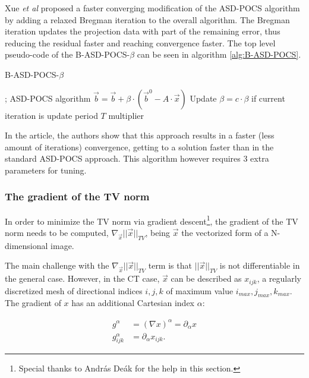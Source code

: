 Xue \textit{et al}\cite{B_ASD_POCS_beta} proposed a faster converging modification of the ASD-POCS algorithm by adding a relaxed Bregman iteration to the overall algorithm. The Bregman iteration updates the projection data with part of the remaining error, thus reducing the residual faster and reaching convergence faster. The top level pseudo-code of the B-ASD-POCS-$\beta$  can be seen in algorithm \ref{alg:B-ASD-POCS}.
%

\begin{algorithm}

\caption{B-ASD-POCS-$\beta$
\label{alg:B-ASD-POCS}}
\begin{algorithmic}[1]
;
\State ASD-POCS algorithm
\EndFor
\State $\vec{b}=\vec{b}+\beta\cdot(\vec{b}^0-A\cdot\vec{x})$
\State Update $\beta=c\cdot\beta$ if current iteration is update period $T$ multiplier 
\EndWhile

\end{algorithmic}
\end{algorithm}

In the article, the authors show that this approach results in a faster (less amount of iterations) convergence,  getting to a solution faster than in the standard ASD-POCS approach. This algorithm however requires 3 extra parameters for tuning. 


\FloatBarrier
\subsubsection{The gradient of the TV norm}

In order to minimize the TV norm via gradient descent\footnote{Special thanks to Andr\'as De\'ak for the help\cite{Andras} in this section.}, the gradient of the TV norm needs to be computed, $ \nabla_{\vec{x}} ||\vec x ||_{TV}$, being $\vec x$ the vectorized form of a N-dimensional image.

The main challenge with the $ \nabla_{\vec{x}} ||\vec x ||_{TV}$ term is that $ ||\vec x ||_{TV}$ is not differentiable in the general case. However, in the CT case, $\vec{x}$ can be described as $x_{ijk}$, a regularly discretized mesh of directional indices $i,j,k$ of maximum value $i_{max},j_{max},k_{max}$. The gradient of $x$ has an additional Cartesian index $\alpha$:

\begin{align}
g^\alpha &=\left(\nabla x\right)^\alpha=\partial_\alpha x\\
g^\alpha_{ijk} & = \partial_\alpha x_{ijk}.
\end{align}

